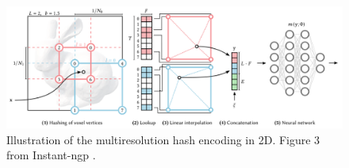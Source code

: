 \begin{figure}[H]
    \centering
    \includegraphics[width=1.0\textwidth]{figures/instant-ngp-hash-encoding.png}
    \caption[Illustration of multiresolution hash encoding]{Illustration of the multiresolution hash encoding in 2D. Figure 3 from Instant-ngp \cite{muller_instant_2022}.}
    \label{fig:instant-ngp-hash-encoding}
\end{figure}